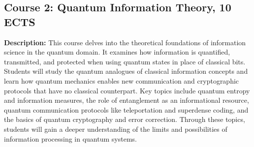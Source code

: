 \documentclass{scrreprt}
\begin{document}
\subsection{Course 2: Quantum Information Theory, 10 ECTS}

\textbf{Description:} This course delves into the theoretical foundations of information science in the quantum domain. It examines how information is quantified, transmitted, and protected when using quantum states in place of classical bits. Students will study the quantum analogues of classical information concepts and learn how quantum mechanics enables new communication and cryptographic protocols that have no classical counterpart. Key topics include quantum entropy and information measures, the role of entanglement as an informational resource, quantum communication protocols like teleportation and superdense coding, and the basics of quantum cryptography and error correction. Through these topics, students will gain a deeper understanding of the limits and possibilities of information processing in quantum systems.
\end{document}

